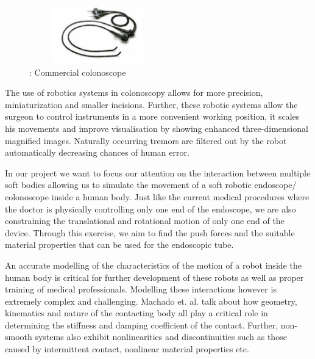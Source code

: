 \documentclass[12pt]{report}
\begin{document}

\begin{figure}[H]
	\begin{Center}
		\includegraphics[width=2.31in,height=1.0in]{./media/image2.png}
		\caption{: Commercial colonoscope}
		\label{fig:_Commercial_colonoscope}
	\end{Center}
\end{figure}



\par

\par

The use of robotics systems in colonoscopy allows for more precision, miniaturization and smaller incisions. Further, these robotic systems allow the surgeon to control instruments in a more convenient working position, it scales his movements and improve visualisation by showing enhanced three-dimensional magnified images. Naturally occurring tremors are filtered out by the robot automatically decreasing chances of human error.\par

In our project we want to focus our attention on the interaction between multiple soft bodies allowing us to simulate the movement of a soft robotic endoscope/ colonoscope inside a human body. Just like the current medical procedures where the doctor is physically controlling only one end of the endoscope, we are also constraining the translational and rotational motion of only one end of the device. Through this exercise, we aim to find the push forces and the suitable material properties that can be used for the endoscopic tube.\par

An accurate modelling of the characteristics of the motion of a robot inside the human body is critical for further development of these robots as well as proper training of medical professionals. Modelling these interactions however is extremely complex and challenging. Machado et. al. \cite{MACHADO201299} talk about how geometry, kinematics and nature of the contacting body all play a critical role in determining the stiffness and damping coefficient of the contact. Further, non-smooth systems also exhibit nonlinearities and discontinuities such as those caused by intermittent contact, nonlinear material properties etc. \par
\end{document}
